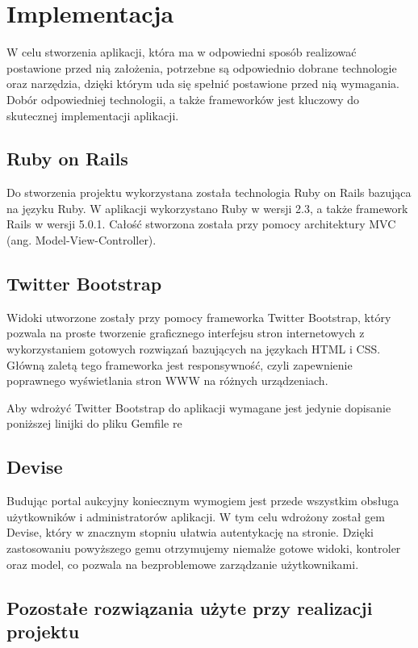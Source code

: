 \documentclass[brudnopis]{xmgr}
\begin{document}
\chapter{Implementacja}
W celu stworzenia aplikacji, która ma w odpowiedni sposób realizować postawione przed nią
założenia, potrzebne są odpowiednio dobrane technologie oraz narzędzia, dzięki którym uda się 
spełnić postawione przed nią wymagania. Dobór odpowiedniej technologii, a także frameworków 
jest kluczowy do skutecznej implementacji aplikacji.

\section{Ruby on Rails}
Do stworzenia projektu wykorzystana została technologia Ruby on Rails bazująca na języku Ruby.
W aplikacji wykorzystano Ruby w wersji 2.3, a także framework Rails w wersji 5.0.1. Całość stworzona
została przy pomocy architektury MVC (ang. Model-View-Controller).

\section{Twitter Bootstrap}
Widoki utworzone zostały przy pomocy frameworka Twitter Bootstrap, który pozwala na proste tworzenie
graficznego interfejsu stron internetowych z wykorzystaniem gotowych rozwiązań bazujących na językach
HTML i CSS. Główną zaletą tego frameworka jest responsywność, czyli zapewnienie poprawnego wyświetlania
stron WWW na różnych urządzeniach. 

Aby wdrożyć Twitter Bootstrap do aplikacji wymagane jest jedynie dopisanie poniższej linijki do pliku Gemfile
re
\section{Devise}

Budując portal aukcyjny koniecznym wymogiem jest przede wszystkim obsługa użytkowników i administratorów aplikacji. W tym celu wdrożony został gem Devise, który w znacznym stopniu ułatwia autentykację na stronie. Dzięki zastosowaniu powyższego gemu otrzymujemy niemalże gotowe widoki, kontroler oraz model, co pozwala na bezproblemowe zarządzanie użytkownikami.

\section{Pozostałe rozwiązania użyte przy realizacji projektu}
\end{document}
